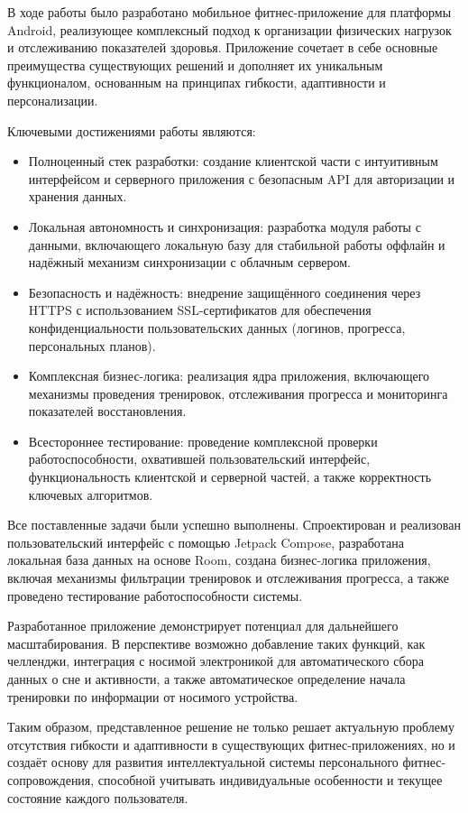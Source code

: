 В ходе работы было разработано мобильное фитнес-приложение для платформы Android, реализующее комплексный подход к организации физических нагрузок и отслеживанию показателей здоровья. Приложение сочетает в себе основные преимущества существующих решений и дополняет их уникальным функционалом, основанным на принципах гибкости, адаптивности и персонализации.

Ключевыми достижениями работы являются:

\begin{itemize}
    \item Полноценный стек разработки: создание клиентской части с интуитивным интерфейсом и серверного приложения с безопасным API для авторизации и хранения данных.

    \item Локальная автономность и синхронизация: разработка модуля работы с данными, включающего локальную базу для стабильной работы оффлайн и надёжный механизм синхронизации с облачным сервером.

    \item Безопасность и надёжность: внедрение защищённого соединения через HTTPS с использованием SSL-сертификатов для обеспечения конфиденциальности пользовательских данных (логинов, прогресса, персональных планов).

    \item Комплексная бизнес-логика: реализация ядра приложения, включающего механизмы проведения тренировок, отслеживания прогресса и мониторинга показателей восстановления.

    \item Всестороннее тестирование: проведение комплексной проверки работоспособности, охватившей пользовательский интерфейс, функциональность клиентской и серверной частей, а также корректность ключевых алгоритмов.
\end{itemize}

Все поставленные задачи были успешно выполнены. Спроектирован и реализован пользовательский интерфейс с помощью Jetpack Compose, разработана локальная база данных на основе Room, создана бизнес-логика приложения, включая механизмы фильтрации тренировок и отслеживания прогресса, а также проведено тестирование работоспособности системы.

Разработанное приложение демонстрирует потенциал для дальнейшего масштабирования. В перспективе возможно добавление таких функций, как челленджи, интеграция с носимой электроникой для автоматического сбора данных о сне и активности, а также автоматическое определение начала тренировки по информации от носимого устройства. 

Таким образом, представленное решение не только решает актуальную проблему отсутствия гибкости и адаптивности в существующих фитнес-приложениях, но и создаёт основу для развития интеллектуальной системы персонального фитнес-сопровождения, способной учитывать индивидуальные особенности и текущее состояние каждого пользователя.
